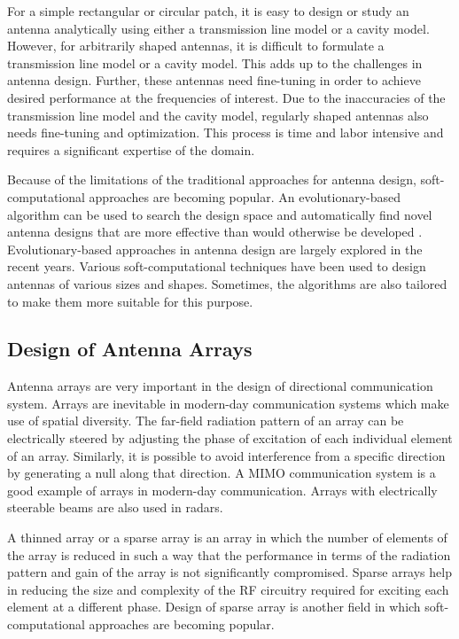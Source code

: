 For a simple rectangular or circular patch, it is easy to design or study an antenna analytically using either a transmission line model or a cavity model. However, for arbitrarily shaped antennas, it is difficult to formulate a transmission line model or a cavity model. This adds up to the challenges in antenna design. Further, these antennas need fine-tuning in order to achieve desired performance at the frequencies of interest. Due to the inaccuracies of the transmission line model and the cavity model, regularly shaped antennas also needs fine-tuning and optimization. This process is time and labor intensive and requires a significant expertise of the domain.

Because of the limitations of the traditional approaches for antenna design, soft-computational approaches are becoming popular. An evolutionary-based algorithm can be used to search the design space and automatically find novel antenna designs that are more effective than would otherwise be developed \cite{cadNASA}. Evolutionary-based approaches in antenna design are largely explored in the recent years. Various soft-computational techniques have been used to design antennas of various sizes and shapes. Sometimes, the algorithms are also tailored to make them more suitable for this purpose.

\subsection{Design of Antenna Arrays}
Antenna arrays are very important in the design of directional communication system. Arrays are inevitable in modern-day communication systems which make use of spatial diversity. The far-field radiation pattern of an array can be electrically steered by adjusting the phase of excitation of each individual element of an array. Similarly, it is possible to avoid interference from a specific direction by generating a null along that direction. A MIMO communication system is a good example of arrays in modern-day communication. Arrays with electrically steerable beams are also used in radars.

A thinned array or a sparse array is an array in which the number of elements of the array is reduced in such a way that the performance in terms of the radiation pattern and gain of the array is not significantly compromised. Sparse arrays help in reducing the size and complexity of the RF circuitry required for exciting each element at a different phase. Design of sparse array is another field in which soft-computational approaches are becoming popular.

